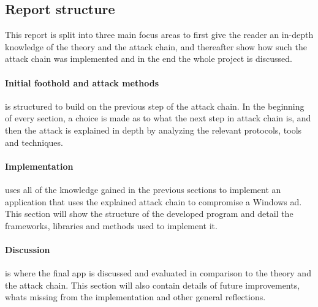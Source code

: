 \documentclass{article}
\begin{document}
\subsection{Report structure}
This report is split into three main focus areas to first give the reader an in-depth knowledge of the theory and the attack chain, and thereafter show how such the attack chain was implemented and in the end the whole project is discussed.

\paragraph{Initial foothold and attack methods} is structured to build on the previous step of the attack chain. In the beginning of every section, a choice is made as to what the next step in attack chain is, and then the attack is explained in depth by analyzing the relevant protocols, tools and techniques.

\paragraph{Implementation} uses all of the knowledge gained in the previous sections to implement an application that uses the explained attack chain to compromise a Windows \gls{ad}. This section will show the structure of the developed program and detail the frameworks, libraries and methods used to implement it.

\paragraph{Discussion} is where the final app is discussed and evaluated in comparison to the theory and the attack chain. This section will also contain details of future improvements, whats missing from the implementation and other general reflections.
\end{document}
